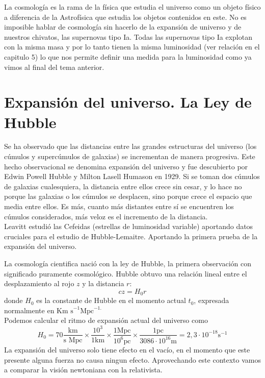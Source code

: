 \documentclass[openany]{book}
\theoremstyle{ucostyle}
\begin{document}
La cosmología es la rama de la física que estudia el universo como un objeto físico a diferencia de la Astrofísica que estudia los objetos contenidos en este. 
No es imposible hablar de cosmología sin hacerlo de la expansión de universo y de nuestros chivatos, las supernovas tipo Ia. Todas las supernovas tipo Ia explotan con la misma masa y por lo tanto tienen la misma luminosidad (ver relación en el capitulo 5) lo que nos permite definir una medida para la luminosidad como ya vimos al final del tema anterior. 

\section{Expansión del universo. La Ley de Hubble}
Se ha observado que las distancias entre las grandes estructuras del universo (los cúmulos y supercúmulos de galaxias) se incrementan de manera progresiva. Este hecho observacional se denomina expansión del universo y fue descubierto por Edwin Powell Hubble y Milton Lasell Humason en 1929. Si se toman dos cúmulos de galaxias cualesquiera, la distancia entre ellos crece sin cesar, y lo hace no porque las galaxias o los cúmulos se desplacen, sino porque crece el espacio que media entre ellos. Es más, cuanto más distantes entre sí se encuentren los cúmulos considerados, más veloz es el incremento de la distancia. 
\\

Leavitt estudió las Cefeidas (estrellas de luminosidad variable) aportando datos cruciales para el estudio de Hubble-Lemaitre. Aportando la primera prueba de la expansión del universo. 

La cosmología cientifica nació con la ley de Hubble, la primera observación con significado puramente cosmológico. Hubble obtuvo una relación lineal entre el desplazamiento al rojo $z$ y la distancia $r$:
\begin{equation}
    cz=H_0r
\end{equation}
donde $H_0$ es la constante de Hubble en el momento actual $t_0$, expresada normalmente en $\text{Km s}^{-1}\text{Mpc}^{-1.}$
\\
Podemos calcular el ritmo de expansión actual del universo como 
\begin{equation}
    H_0=70 \frac{\text{km}}{\text{s Mpc}} \times\frac{10^3}{1 \text{km}} \times\frac{1 \text{Mpc}}{10^6 \text{pc}} \times \frac{1 \text{pc}}{3086 \cdot10^{16} \text{m}}=2,3 \cdot 10^{-18} \text{s}^{-1}
\end{equation}
La expansión del universo solo tiene efecto en el vacío, en el momento que este presente alguna fuerza no causa ningun efecto. Aprovechando este contexto vamos a comparar la visión newtoniana con la relativista. 
\end{document}
